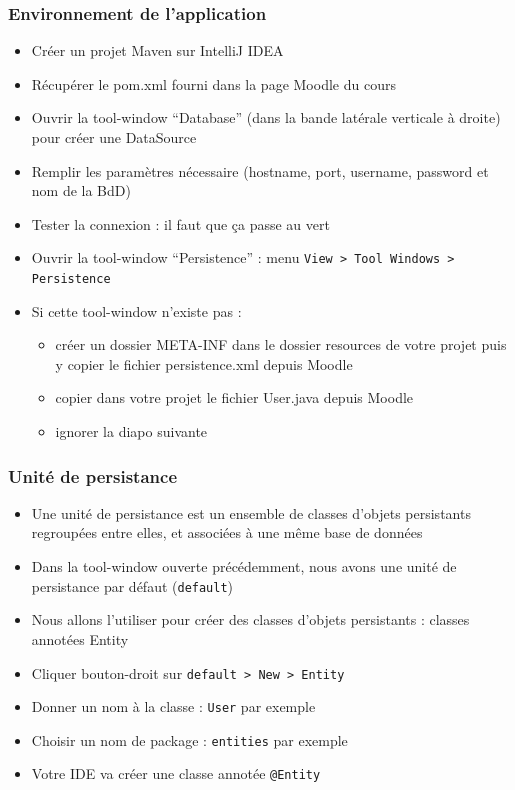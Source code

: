 \documentclass[aspectratio=169,10pt]{beamer}
\begin{document}
\begin{frame}
	\frametitle{Environnement de l'application}
	
	\begin{itemize}
		\item Créer un projet Maven sur IntelliJ IDEA
		\item Récupérer le pom.xml fourni dans la page Moodle du cours
		\item Ouvrir la tool-window ``Database'' (dans la bande latérale verticale à droite) pour créer une DataSource
		\item Remplir les paramètres nécessaire (hostname, port, username, password et nom de la BdD)
		\item Tester la connexion : il faut que ça passe au vert
		\item Ouvrir la tool-window ``Persistence'' : menu \texttt{View > Tool Windows > Persistence}
		\item Si cette tool-window n'existe pas :
		\begin{itemize}
			\item créer un dossier META-INF dans le dossier resources de votre projet puis y copier  le fichier persistence.xml depuis Moodle
			\item copier dans votre projet le fichier User.java depuis Moodle 
			\item ignorer la diapo suivante
		\end{itemize}
		
	\end{itemize}
	
\end{frame}

\begin{frame}
	\frametitle{Unité de persistance}
	
	\begin{itemize}
		\item Une unité de persistance est un ensemble de classes d'objets persistants regroupées entre elles, et associées à une même base de données
		\item Dans la tool-window ouverte précédemment, nous avons une unité de persistance par défaut (\texttt{default})
		\item Nous allons l'utiliser pour créer des classes d'objets persistants : classes annotées Entity
		\item Cliquer bouton-droit sur \texttt{default > New > Entity}
		\item Donner un nom à la classe : \texttt{User} par exemple
		\item Choisir un nom de package : \texttt{entities} par exemple
		\item Votre IDE va créer une classe annotée \texttt{@Entity}
	\end{itemize}
	
\end{frame}
\end{document}
